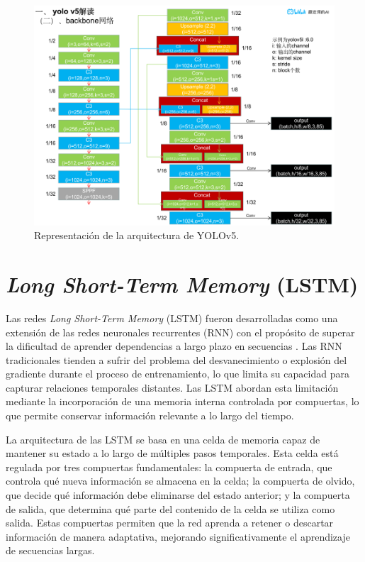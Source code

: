 \begin{figure}[h!] 
    \includegraphics[width=1\textwidth]{images/yolov5.png} 
    \centering 
    \caption{Representación de la arquitectura de YOLOv5\protect\cite{yolov5}.} 
    \label{YOLO} 
\end{figure}

\section{\textit{Long Short-Term Memory} (LSTM)}

Las redes \textit{Long Short-Term Memory} (LSTM) fueron 
desarrolladas como una extensión de las redes neuronales 
recurrentes (RNN) con el propósito de superar la dificultad 
de aprender dependencias a largo plazo en secuencias
\cite{hochreiter1997lstm}. Las 
RNN tradicionales tienden a sufrir del problema del 
desvanecimiento o explosión del gradiente durante el 
proceso de entrenamiento, lo que limita su capacidad 
para capturar relaciones temporales distantes. Las LSTM 
abordan esta limitación mediante la incorporación de una 
memoria interna controlada por compuertas, lo que permite 
conservar información relevante a lo largo del tiempo.

La arquitectura de las LSTM se basa en una celda de memoria 
capaz de mantener su estado a lo largo de múltiples pasos 
temporales. Esta celda está regulada por tres compuertas 
fundamentales: la compuerta de entrada, que controla qué 
nueva información se almacena en la celda; la compuerta 
de olvido, que decide qué información debe eliminarse 
del estado anterior; y la compuerta de salida, que 
determina qué parte del contenido de la celda se utiliza 
como salida. Estas compuertas permiten que la red aprenda a 
retener o descartar información de manera adaptativa, mejorando 
significativamente el aprendizaje de secuencias largas.

